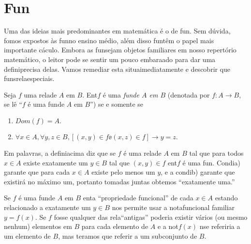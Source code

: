 \section{Fun\cois}\label{funcoes}

Uma das ideias mais predominantes em matem\'atica \'e o de fun\caoi. Sem d\'uvida, fomos expostos \`as fun\coes no ensino m\'edio, al\'em disso fun\coes t\^em o papel mais importante c\'aculo. Embora as fun\coes sejam objetos familiares em nosso repert\'orio matem\'atico, o leitor pode se sentir um pouco embara\cc ado para dar uma defini\cao precisa delas. Vamos remediar esta situa\cao imediatamente e descobrir que fun\coes s\ao rela\coes especiais.
\begin{definb}
Seja $f$ uma rela\cao de $A$ em $B$. Ent\ao $f$ \'e uma {\it fun\cao de $A$ em $B$} (denotada por $f:A\to B$, se l\^e ``$f$ \'e uma fun\cao de $A$ em $B$'') se e somente se
\begin{enumerate}[{\bf a)}]
\item $Dom(f)=A$.
\item $\forall x\in A, \forall y,z\in B, [(x,y)\in f\ee (x,z)\in f]\to y=z$.
\end{enumerate}
\end{definb}

Em palavras, a defini\cao acima diz que se $f$ \'e uma rela\cao de $A$ em $B$ tal que para todos $x\in A$ existe exatamente um $y\in B$ tal que $(x,y)\in f$ ent\ao $f$ \'e uma fun\caoi. Condi\cao a) garante que para cada $x\in A$ existe pelo menos um $y$, e a condi\cao b) garante que existir\'a no m\'aximo um, portanto tomadas juntas obtemos ``exatamente uma.''

Se $f$ \'e uma fun\cao de $A$ em $B$ ent\ao a ``propriedade funcional'' de cada $x\in A$ estando relacionado a exatamente um $y\in B$ nos permite usar a nota\cao funcional familiar $y=f(x)$. Se $f$ fosse qualquer das rela\coes ``antigas'' poderia existir v\'arios (ou mesmo nenhum) elementos em $B$ para cada elemento de $A$ e a not\cao $f(x)$ n\ao se referiria a um elemento de $B$, mas ter\ih amos que referir a um subconjunto de $B$.

